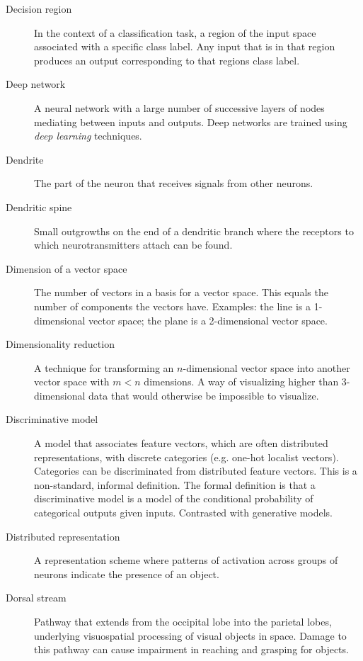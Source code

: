 \begin{description}
\item[Decision region] In the context of a classification task, a region of the input space associated with a specific class label. Any input that is in that region produces an output corresponding to that regions class label.

\item[Deep network] A neural network with a large number of successive layers of nodes mediating between inputs and outputs. Deep networks are trained using \emph{deep learning} techniques.

\item[Dendrite] The part of the neuron that receives signals from other neurons.

\item[Dendritic spine] Small outgrowths on the end of a dendritic branch where the receptors to which neurotransmitters attach can be found.

\item[Dimension of a vector space] The number of vectors in a basis for a vector space. This equals the number of components the vectors have. Examples: the line is a 1-dimensional vector space; the plane is a 2-dimensional vector space.

\item[Dimensionality reduction] A technique for transforming an $n$-dimensional vector space into another vector space with $m<n$ dimensions. A way of visualizing higher than 3-dimensional data that would otherwise be impossible to visualize.

\item[Discriminative model] A model that associates feature vectors, which are often distributed representations, with discrete categories (e.g. one-hot localist vectors).  Categories can be discriminated from distributed feature vectors. This is a non-standard, informal definition. The formal definition is that a discriminative model is a model of the conditional probability of categorical outputs given inputs. Contrasted with generative models.

\item[Distributed representation] A representation scheme where patterns of activation across groups of neurons indicate the presence of an object. 

\item[Dorsal stream] Pathway that extends from the occipital lobe into the parietal lobes, underlying visuospatial processing of visual objects in space. Damage to this pathway can cause impairment in reaching and grasping for objects. 


\end{description}
